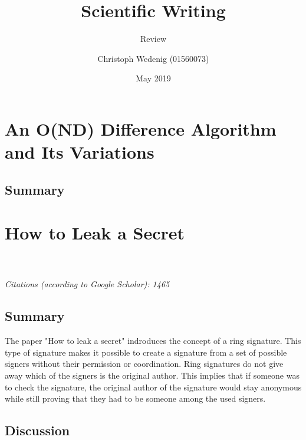 \documentclass{scrartcl}
\title{Scientific Writing}
\subtitle{Review}
\author{Christoph Wedenig (01560073)}
\date{May 2019}
\begin{document}
\maketitle

\section{An O(ND) Difference Algorithm and Its Variations}

\subsection{Summary}


\section{How to Leak a Secret}
\\\\
\emph{Citations (according to Google Scholar): 1465}
\subsection{Summary}
The paper "How to leak a secret" \cite{rivest2001leak} indroduces the concept of a ring signature. This type of signature makes it possible to create a signature from a set of possible signers without their permission or coordination. Ring signatures do not give away which of the signers is the original author.  This implies that if someone was to check the signature, the original author of the signature would stay anonymous while still proving that they had to be someone among the used signers. %

\subsection{Discussion}
\end{document}
